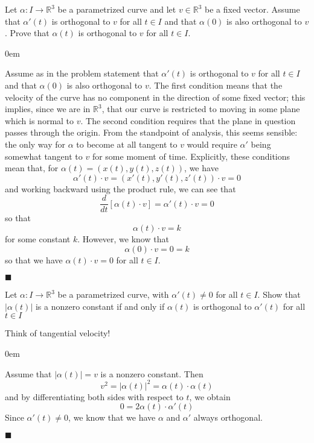 \documentclass[12pt]{article}
\renewcommand{\qed}{\hfill$\blacksquare$}
\renewenvironment{proof}{\begin{addmargin}[1em]{0em}\begin{newproof}}{\end{newproof}\end{addmargin}\qed}
\newenvironment{problem}[2][Exercise]{\begin{trivlist}
\item[\hskip \labelsep {\bfseries #1}\hskip \labelsep {\bfseries #2.}]}{\end{trivlist}}
\begin{document}
\begin{problem}{1.2.4}
Let $\alpha:I\rightarrow \mathbb{R}^3$ be a parametrized curve and let $v\in \mathbb{R}^3$ be a fixed vector. Assume that $\alpha'\left(t\right)$ is orthogonal to $v$ for all $t\in I$ and that $\alpha\left(0\right)$ is also orthogonal to $v$. Prove that $\alpha\left(t\right)$ is orthogonal to $v$ for all $t\in I$.
\end{problem}
\begin{proof}
Assume as in the problem statement that $\alpha'\left(t\right)$ is orthogonal to $v$ for all $t\in I$ and that $\alpha\left(0\right)$ is also orthogonal to $v$. {\color{red}The first condition means that the velocity of the curve has no component in the direction of some fixed vector; this implies, since we are in $\mathbb{R}^3$, that our curve is restricted to moving in some plane which is normal to $v$. The second condition requires that the plane in question passes through the origin. From the standpoint of analysis, this seems sensible: the only way for $\alpha$ to become at all tangent to $v$ would require $\alpha'$ being somewhat tangent to $v$ for some moment of time.} Explicitly, these conditions mean that, for $\alpha\left(t\right) = \left(x\left( t\right),y\left( t\right),z\left(t \right) \right)$, we have \[ \alpha'\left(t\right)\cdot v = \left( x'\left(t \right),y'\left(t \right),z'\left( t\right)\right)\cdot v = 0\] and working backward using the product rule, we can see that \[ \frac{d}{dt} \left[ \alpha\left(t\right)\cdot v \right] = \alpha'\left(t\right)\cdot v = 0 \] so that \[ \alpha\left(t\right)\cdot v = k \] for some constant $k$. However, we know that \[ \alpha\left(0\right) \cdot v = 0 = k \] so that we have $\alpha\left(t\right)\cdot v = 0$ for all $t\in I$.
\end{proof}







\begin{problem}{1.2.5}
Let $\alpha:I\rightarrow \mathbb{R}^3$ be a parametrized curve, with $\alpha'\left(t\right)\neq 0$ for all $t\in I$. Show that $\left|\alpha\left(t\right)\right|$ is a nonzero constant if and only if $\alpha\left(t\right)$ is orthogonal to $\alpha'\left(t\right)$ for all $t\in I$
\end{problem}
{\color{red} Think of tangential velocity!}
\begin{proof}
Assume that $\left|\alpha\left(t\right)\right| = v$ is a nonzero constant. Then \[ v^2= \left|\alpha\left(t\right)\right|^2 = \alpha\left(t\right)\cdot \alpha\left(t\right)\] and by differentiating both sides with respect to $t$, we obtain \[ 0 = 2\alpha\left(t\right)\cdot \alpha'\left(t\right) \] Since $\alpha'\left(t\right)\neq 0$, we know that we have $\alpha$ and $\alpha'$ always orthogonal.
\end{proof}
\end{document}
